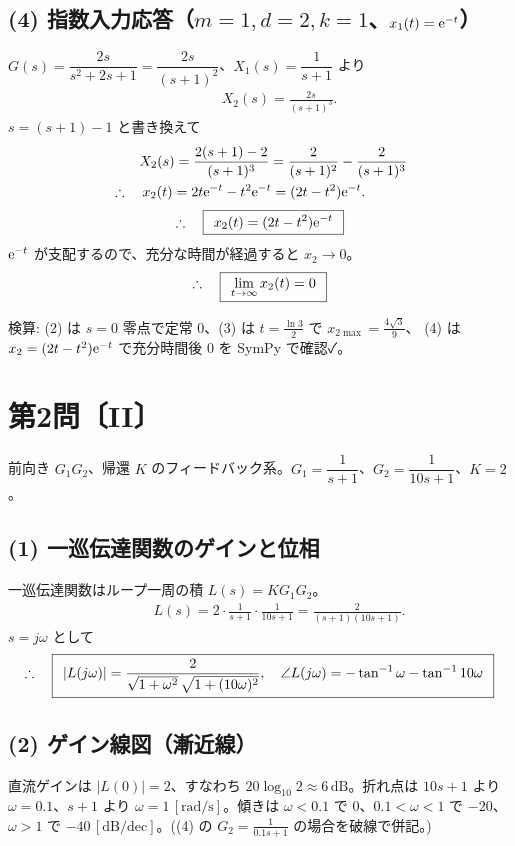 \documentclass[11pt,a4paper]{article}
\begin{document}
\subsection*{(4) 指数入力応答（$m=1,d=2,k=1$、$x_1(t)=\mathrm{e}^{-t}$）}
$G(s)=\dfrac{2s}{s^2+2s+1}=\dfrac{2s}{(s+1)^2}$、$X_1(s)=\dfrac{1}{s+1}$ より
\begin{align*}
  &\qquad X_2(s)=\frac{2s}{(s+1)^3}.
\end{align*}
$s=(s+1)-1$ と書き換えて
\begin{align*}
  &\qquad X_2(s)=\frac{2(s+1)-2}{(s+1)^3}=\frac{2}{(s+1)^2}-\frac{2}{(s+1)^3}\\
  &\therefore\quad x_2(t)=2t\mathrm{e}^{-t}-t^2\mathrm{e}^{-t}=(2t-t^2)\mathrm{e}^{-t}.
\end{align*}
\[
  \therefore\quad \boxed{\,\;x_2(t)=(2t-t^2)\mathrm{e}^{-t}\;\,}
\]
$\mathrm{e}^{-t}$ が支配するので、充分な時間が経過すると $x_2\to0$。
\[
  \therefore\quad \boxed{\,\;\lim_{t\to\infty}x_2(t)=0\;\,}
\]

\bigskip
\noindent 検算: (2) は $s=0$ 零点で定常 $0$、(3) は $t=\tfrac{\ln3}{2}$ で $x_{2\max}=\tfrac{4\sqrt3}{9}$、
(4) は $x_2=(2t-t^2)\mathrm{e}^{-t}$ で充分時間後 $0$ を SymPy で確認✓。

\newpage
\section*{第2問〔II〕}

前向き $G_1G_2$、帰還 $K$ のフィードバック系。$G_1=\dfrac{1}{s+1}$、$G_2=\dfrac{1}{10s+1}$、$K=2$。

\subsection*{(1) 一巡伝達関数のゲインと位相}
一巡伝達関数はループ一周の積 $L(s)=K G_1 G_2$。
\begin{align*}
  &\qquad L(s)=2\cdot\frac{1}{s+1}\cdot\frac{1}{10s+1}=\frac{2}{(s+1)(10s+1)}.
\end{align*}
$s=j\omega$ として
\[
  \therefore\quad \boxed{\,\;|L(j\omega)|=\dfrac{2}{\sqrt{1+\omega^2}\,\sqrt{1+(10\omega)^2}},\quad
  \angle L(j\omega)=-\tan^{-1}\omega-\tan^{-1}10\omega\;\,}
\]

\subsection*{(2) ゲイン線図（漸近線）}
直流ゲインは $|L(0)|=2$、すなわち $20\log_{10}2\approx6\,\mathrm{dB}$。折れ点は $10s+1$ より
$\omega=0.1$、$s+1$ より $\omega=1\,[\mathrm{rad/s}]$。傾きは $\omega<0.1$ で $0$、$0.1<\omega<1$ で
$-20$、$\omega>1$ で $-40\,[\mathrm{dB/dec}]$。((4) の $G_2=\frac{1}{0.1s+1}$ の場合を破線で併記。)
\end{document}
